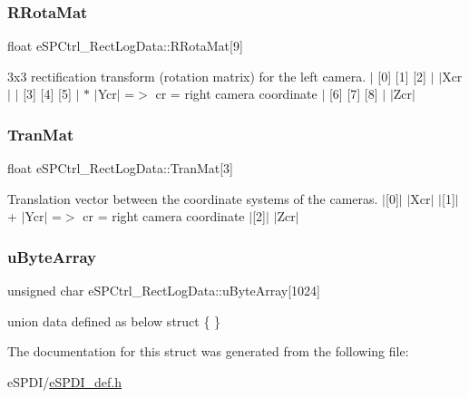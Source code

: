 \subsubsection{\texorpdfstring{R\+Rota\+Mat}{RRotaMat}}
{\footnotesize\ttfamily float e\+S\+P\+Ctrl\+\_\+\+Rect\+Log\+Data\+::\+R\+Rota\+Mat\mbox{[}9\mbox{]}}

3x3 rectification transform (rotation matrix) for the left camera. $\vert$ \mbox{[}0\mbox{]} \mbox{[}1\mbox{]} \mbox{[}2\mbox{]} $\vert$ $\vert$\+Xcr$\vert$ $\vert$ \mbox{[}3\mbox{]} \mbox{[}4\mbox{]} \mbox{[}5\mbox{]} $\vert$ $\ast$ $\vert$\+Ycr$\vert$ =$>$ cr = right camera coordinate $\vert$ \mbox{[}6\mbox{]} \mbox{[}7\mbox{]} \mbox{[}8\mbox{]} $\vert$ $\vert$\+Zcr$\vert$ \mbox{\label{structe_s_p_ctrl___rect_log_data_ac508a492634c53c6936fb3cb77052bb1}} 
\subsubsection{\texorpdfstring{Tran\+Mat}{TranMat}}
{\footnotesize\ttfamily float e\+S\+P\+Ctrl\+\_\+\+Rect\+Log\+Data\+::\+Tran\+Mat\mbox{[}3\mbox{]}}

Translation vector between the coordinate systems of the cameras. $\vert$\mbox{[}0\mbox{]}$\vert$ $\vert$\+Xcr$\vert$ $\vert$\mbox{[}1\mbox{]}$\vert$ + $\vert$\+Ycr$\vert$ =$>$ cr = right camera coordinate $\vert$\mbox{[}2\mbox{]}$\vert$ $\vert$\+Zcr$\vert$ \mbox{\label{structe_s_p_ctrl___rect_log_data_a15a8274185b2ab04ef9c3751ab38c135}} 
\subsubsection{\texorpdfstring{u\+Byte\+Array}{uByteArray}}
{\footnotesize\ttfamily unsigned char e\+S\+P\+Ctrl\+\_\+\+Rect\+Log\+Data\+::u\+Byte\+Array\mbox{[}1024\mbox{]}}

union data defined as below struct \{ \} 

The documentation for this struct was generated from the following file\+:\begin{DoxyCompactItemize}
\item 
e\+S\+P\+D\+I/\hyperlink{e_s_p_d_i__def_8h}{e\+S\+P\+D\+I\+\_\+def.\+h}\end{DoxyCompactItemize}
